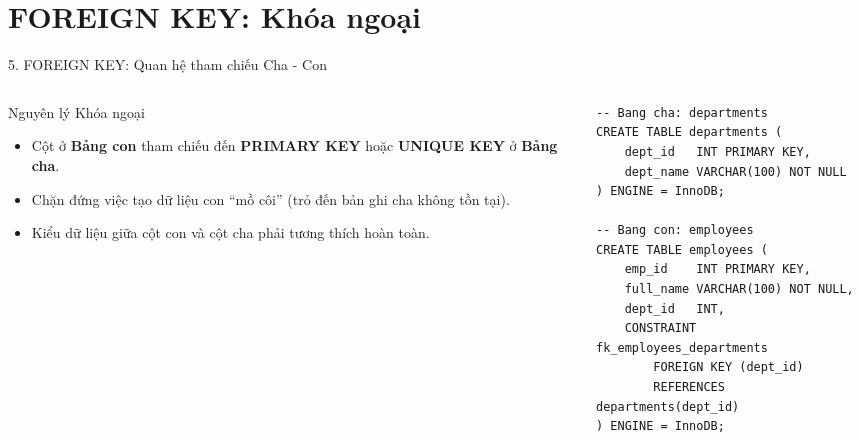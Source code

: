 \documentclass[aspectratio=169,11pt]{beamer}
\newcommand{\kw}[1]{\textcolor{dbblue}{\textbf{#1}}}
\begin{document}
\section{FOREIGN KEY: Khóa ngoại}
\begin{frame}[fragile]{5. FOREIGN KEY: Quan hệ tham chiếu Cha - Con}
\begin{columns}[t]
  \begin{column}{0.48\textwidth}
    \begin{block}{Nguyên lý Khóa ngoại}
      \begin{itemize}\setlength{\itemsep}{1.5pt}
        \item Cột ở \kw{Bảng con} tham chiếu đến \kw{PRIMARY KEY} hoặc \kw{UNIQUE KEY} ở \kw{Bảng cha}.
        \item Chặn đứng việc tạo dữ liệu con “mồ côi” (trỏ đến bản ghi cha không tồn tại).
        \item Kiểu dữ liệu giữa cột con và cột cha phải tương thích hoàn toàn.
      \end{itemize}
    \end{block}
  \end{column}
  \begin{column}{0.50\textwidth}
\begin{lstlisting}
-- Bang cha: departments
CREATE TABLE departments (
    dept_id   INT PRIMARY KEY,
    dept_name VARCHAR(100) NOT NULL
) ENGINE = InnoDB;

-- Bang con: employees
CREATE TABLE employees (
    emp_id    INT PRIMARY KEY,
    full_name VARCHAR(100) NOT NULL,
    dept_id   INT,
    CONSTRAINT fk_employees_departments
        FOREIGN KEY (dept_id)
        REFERENCES departments(dept_id)
) ENGINE = InnoDB;
\end{lstlisting}
  \end{column}
\end{columns}
\end{frame}
\end{document}
